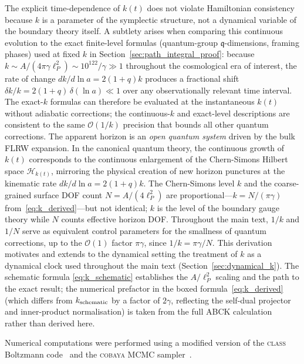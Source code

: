 \documentclass[aps,prd,twocolumn,10pt,superscriptaddress,nofootinbib]{revtex4-2}
\begin{document}
The explicit time-dependence of $k(t)$ does not violate
Hamiltonian consistency because $k$ is a parameter of the
symplectic structure, not a dynamical variable of the boundary
theory itself.  A subtlety arises when comparing this continuous
evolution to the exact finite-level formulas (quantum-group
$\mathfrak{q}$-dimensions, framing phases) used at fixed $k$ in
Section~\ref{sec:path_integral_proof}: because
$k \sim A/(4\pi\gamma\ell_P^2) \sim 10^{122}/\gamma \gg 1$
throughout the cosmological era of interest, the rate of change
$dk/d\ln a = 2(1+q)k$ produces a fractional shift
$\delta k/k = 2(1+q)\,\delta(\ln a) \ll 1$ over any
observationally relevant time interval.  The exact-$k$ formulas
can therefore be evaluated at the instantaneous $k(t)$ without
adiabatic corrections; the continuous-$k$ and exact-level
descriptions are consistent to the same $\mathcal{O}(1/k)$
precision that bounds all other quantum corrections.  The apparent horizon is an \emph{open quantum
system} driven by the bulk FLRW expansion.  In the canonical
quantum theory, the continuous growth of $k(t)$ corresponds to
the continuous enlargement of the Chern-Simons Hilbert space
$\mathcal{H}_{k(t)}$, mirroring the physical creation of new
horizon punctures at the kinematic rate
$dk/d\ln a = 2(1+q)k$.  The Chern-Simons level $k$ and the
coarse-grained surface DOF count $N = A/(4\ell_P^2)$ are
proportional---$k = N/(\pi\gamma)$ from~\eqref{eq:k_derived}---but
not identical; $k$ is the level of the boundary gauge theory
while $N$ counts effective horizon DOF.  Throughout the main
text, $1/k$ and $1/N$ serve as equivalent control parameters
for the smallness of quantum corrections, up to the
$\mathcal{O}(1)$ factor $\pi\gamma$, since $1/k=\pi\gamma/N$.  This derivation motivates and extends to the dynamical setting the
treatment of $k$ as a dynamical clock used throughout the main
text (Section~\ref{sec:dynamical_k}).  The schematic formula
\eqref{eq:k_schematic} establishes the $A/\ell_P^2$ scaling
and the path to the exact result; the numerical prefactor in
the boxed formula~\eqref{eq:k_derived} (which differs from
$k_{\rm schematic}$ by a factor of $2\gamma$, reflecting the
self-dual projector and inner-product normalisation) is taken
from the full ABCK calculation~\cite{Ashtekar1998} rather than
derived here.


\begin{acknowledgments}
Numerical computations were performed using a modified version of
the \textsc{class} Boltzmann code~\cite{Blas2011} and the
\textsc{cobaya} MCMC sampler~\cite{Torrado2021}.
\end{acknowledgments}
\end{document}

